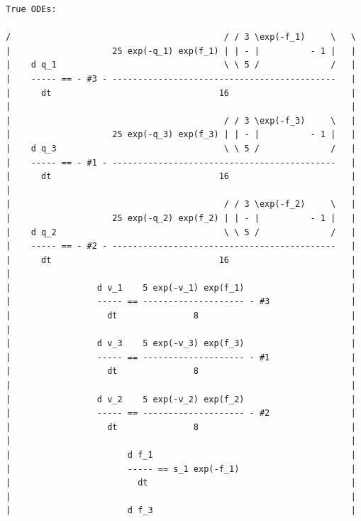 {\centering\small
        \color{MidnightBlue} \begin{verbatim} 
True ODEs:
 
/                                          / / 3 \exp(-f_1)     \   \
|                    25 exp(-q_1) exp(f_1) | | - |          - 1 |   |
|    d q_1                                 \ \ 5 /              /   |
|    ----- == - #3 - --------------------------------------------   |
|      dt                                 16                        |
|                                                                   |
|                                          / / 3 \exp(-f_3)     \   |
|                    25 exp(-q_3) exp(f_3) | | - |          - 1 |   |
|    d q_3                                 \ \ 5 /              /   |
|    ----- == - #1 - --------------------------------------------   |
|      dt                                 16                        |
|                                                                   |
|                                          / / 3 \exp(-f_2)     \   |
|                    25 exp(-q_2) exp(f_2) | | - |          - 1 |   |
|    d q_2                                 \ \ 5 /              /   |
|    ----- == - #2 - --------------------------------------------   |
|      dt                                 16                        |
|                                                                   |
|                 d v_1    5 exp(-v_1) exp(f_1)                     |
|                 ----- == -------------------- - #3                |
|                   dt               8                              |
|                                                                   |
|                 d v_3    5 exp(-v_3) exp(f_3)                     |
|                 ----- == -------------------- - #1                |
|                   dt               8                              |
|                                                                   |
|                 d v_2    5 exp(-v_2) exp(f_2)                     |
|                 ----- == -------------------- - #2                |
|                   dt               8                              |
|                                                                   |
|                       d f_1                                       |
|                       ----- == s_1 exp(-f_1)                      |
|                         dt                                        |
|                                                                   |
|                       d f_3                                       |

\end{verbatim}}

